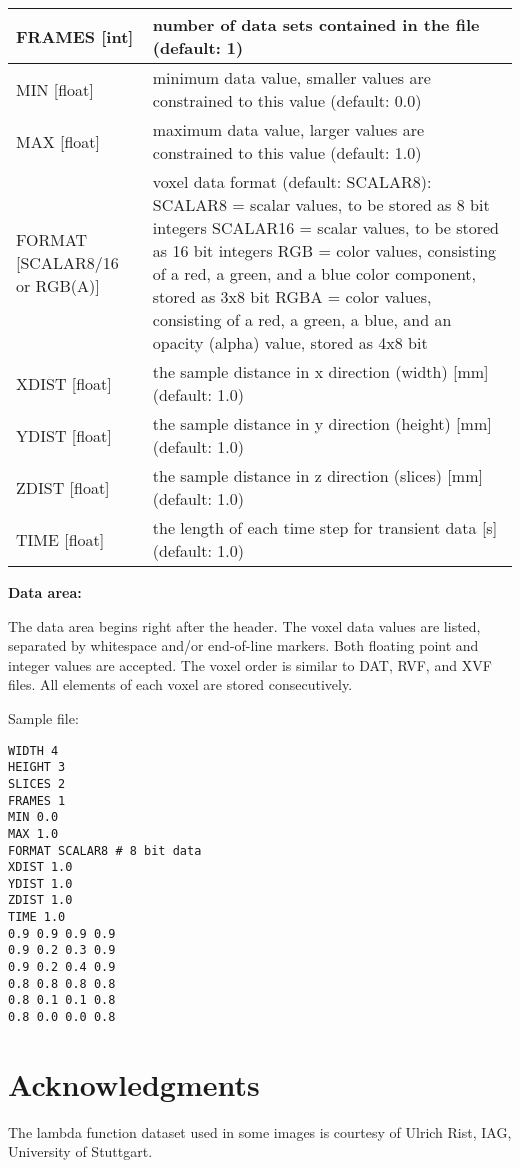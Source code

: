 \begin{longtable}{|p{3.5cm}|p{10.5cm}|}
\hline
     	FRAMES [int]   	& number of data sets contained in the file (default: 1) \\                
\hline
 	MIN [float]	& minimum data value, smaller values are constrained to this value (default: 0.0) \\		
\hline
	MAX [float]	& maximum data value, larger values are constrained to this value (default: 1.0) \\
\hline
	FORMAT [SCALAR8/16 or RGB(A)] 
	& voxel data format (default: SCALAR8): \newline 
          SCALAR8 = scalar values, to be stored as 8 bit integers \newline 
          SCALAR16 = scalar values, to be stored as 16 bit integers \newline 
          RGB = color values, consisting of a red, a green, and a blue color component,
          stored as 3x8 bit \newline
          RGBA = color values, consisting of a red, a green, a blue, and an opacity
          (alpha) value, stored as 4x8 bit \\
\hline
	XDIST [float]	& the sample distance in x direction (width) [mm] (default: 1.0) \\
\hline
	YDIST [float]	& the sample distance in y direction (height) [mm] (default: 1.0) \\
\hline
	ZDIST [float]	& the sample distance in z direction (slices) [mm] (default: 1.0) \\
\hline
	TIME [float]	& the length of each time step for transient data [s] (default: 1.0) \\
\hline
\end{longtable}

{\bf Data area:} 

The data area begins right after the header. The voxel data values are listed, separated by whitespace 
and/or end-of-line markers. Both floating point and integer values are accepted. The voxel order is similar to DAT, 
RVF, and XVF files. All elements of each voxel are stored consecutively.

Sample file:
\begin{verbatim}
WIDTH 4
HEIGHT 3
SLICES 2
FRAMES 1
MIN 0.0
MAX 1.0
FORMAT SCALAR8 # 8 bit data
XDIST 1.0
YDIST 1.0
ZDIST 1.0
TIME 1.0
0.9 0.9 0.9 0.9
0.9 0.2 0.3 0.9
0.9 0.2 0.4 0.9
0.8 0.8 0.8 0.8
0.8 0.1 0.1 0.8
0.8 0.0 0.0 0.8 
\end{verbatim}

\section{Acknowledgments}

The lambda function dataset used in some images is courtesy of Ulrich Rist, IAG, University of Stuttgart.





